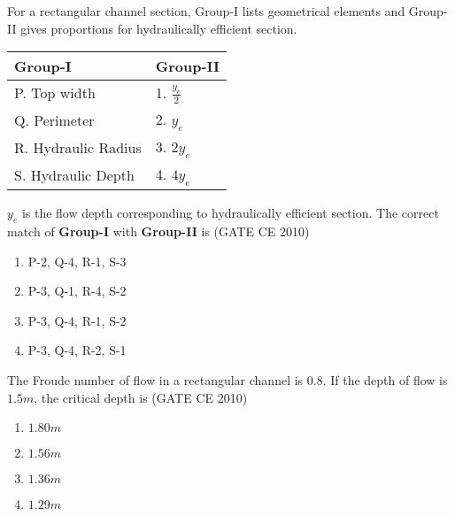 \iffalse
\chapter{2010}
\author{AI24BTECH11030}
\section{ce}
\fi
        
    \item For a rectangular channel section, Group-I lists geometrical elements and Group-II gives proportions for hydraulically efficient section.
    \begin{table}[h!]
        \begin{center}
            \begin{tabular}{l|l}
            \textbf{Group-I} & \textbf{Group-II} \\ \hline
            P. Top width & 1. $\frac{y_e}{2}$ \\
            Q. Perimeter & 2. $y_e$ \\
            R. Hydraulic Radius & 3. $2y_e$ \\
            S. Hydraulic Depth & 4. $4y_e$ \\
            \end{tabular}
        \end{center}
    \end{table}

    $y_e$ is the flow depth corresponding to hydraulically efficient section. The correct match of \textbf{Group-I} with \textbf{Group-II} is \hfill (GATE CE 2010)
    \begin{multicols}{2}
        \begin{enumerate}
            \item P-2, Q-4, R-1, S-3
            \item P-3, Q-1, R-4, S-2
            \item P-3, Q-4, R-1, S-2
            \item P-3, Q-4, R-2, S-1
        \end{enumerate}
    \end{multicols}

    \item The Froude number of flow in a rectangular channel is 0.8. If the depth of flow is $1.5 m$, the critical depth is \hfill (GATE CE 2010)
    \begin{multicols}{4}
        \begin{enumerate}
            \item $1.80 m$
            \item $1.56 m$
            \item $1.36 m$
            \item $1.29 m$
        \end{enumerate}
    \end{multicols}

